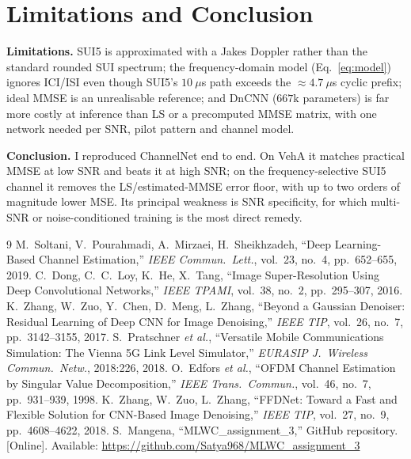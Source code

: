 \documentclass[a4paper,10pt]{article}
\begin{document}
\section{Limitations and Conclusion}
\textbf{Limitations.} SUI5 is approximated with a Jakes Doppler rather than the
standard rounded SUI spectrum; the frequency-domain model
(Eq.~\ref{eq:model}) ignores ICI/ISI even though SUI5's $10~\mu$s path exceeds
the $\approx4.7~\mu$s cyclic prefix; ideal MMSE is an unrealisable reference; and
DnCNN ($667$k parameters) is far more costly at inference than LS or a
precomputed MMSE matrix, with one network needed per SNR, pilot pattern and
channel model.

\textbf{Conclusion.} I reproduced ChannelNet end to end. On VehA it matches
practical MMSE at low SNR and beats it at high SNR; on the frequency-selective
SUI5 channel it removes the LS/estimated-MMSE error floor, with up to two orders
of magnitude lower MSE. Its principal weakness is SNR specificity, for which
multi-SNR or noise-conditioned training is the most direct remedy.

{\small
\begin{thebibliography}{9}
 M.~Soltani, V.~Pourahmadi, A.~Mirzaei, H.~Sheikhzadeh,
``Deep Learning-Based Channel Estimation,'' \textit{IEEE Commun.\ Lett.}, vol.~23,
no.~4, pp.~652--655, 2019.
 C.~Dong, C.~C.~Loy, K.~He, X.~Tang, ``Image Super-Resolution
Using Deep Convolutional Networks,'' \textit{IEEE TPAMI}, vol.~38, no.~2,
pp.~295--307, 2016.
 K.~Zhang, W.~Zuo, Y.~Chen, D.~Meng, L.~Zhang, ``Beyond a
Gaussian Denoiser: Residual Learning of Deep CNN for Image Denoising,''
\textit{IEEE TIP}, vol.~26, no.~7, pp.~3142--3155, 2017.
 S.~Pratschner \textit{et al.}, ``Versatile Mobile
Communications Simulation: The Vienna 5G Link Level Simulator,'' \textit{EURASIP
J.\ Wireless Commun.\ Netw.}, 2018:226, 2018.
 O.~Edfors \textit{et al.}, ``OFDM Channel Estimation by
Singular Value Decomposition,'' \textit{IEEE Trans.\ Commun.}, vol.~46, no.~7,
pp.~931--939, 1998.
 K.~Zhang, W.~Zuo, L.~Zhang, ``FFDNet: Toward a Fast
and Flexible Solution for CNN-Based Image Denoising,'' \textit{IEEE TIP},
vol.~27, no.~9, pp.~4608--4622, 2018.
 S.~Mangena, ``MLWC\_assignment\_3,'' GitHub repository.
[Online]. Available: \url{https://github.com/Satya968/MLWC_assignment_3}
\end{thebibliography}
}
\end{document}
